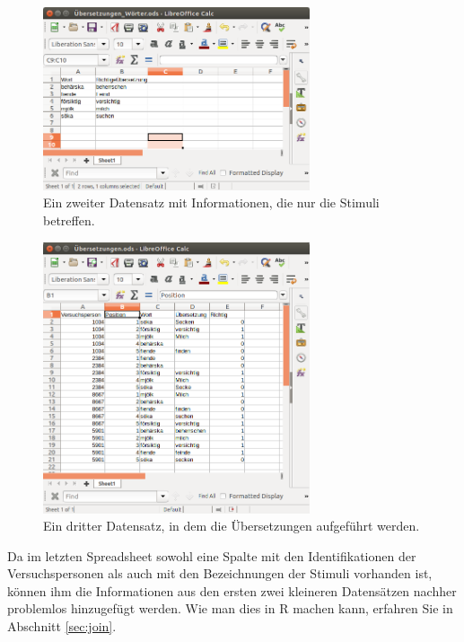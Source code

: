 \documentclass[oneside, 10pt]{book}\usepackage[]{graphicx}\usepackage[]{xcolor}
\begin{document}
\begin{figure}[tp]
\centering
\includegraphics[max width = 0.7\textwidth]{figs/woerter.png}
\caption{Ein zweiter Datensatz mit Informationen, die nur die Stimuli betreffen.}
\label{fig:woerter}
\end{figure}

\begin{figure}[tp]
\centering
\includegraphics[max width = 0.7\textwidth]{figs/uebersetzungen.png}
\caption{Ein dritter Datensatz, in dem die Übersetzungen aufgeführt werden.}
\label{fig:uebersetzungen}
\end{figure}

Da im letzten Spread\-sheet sowohl eine Spalte mit
den Identifikationen der Versuchspersonen als
auch mit den Bezeichnungen der Stimuli vorhanden ist,
können ihm die Informationen aus den ersten zwei kleineren
Datensätzen nachher problemlos hinzugefügt werden.
Wie man dies in R machen kann, erfahren Sie in Abschnitt \ref{sec:join}.
\end{document}
